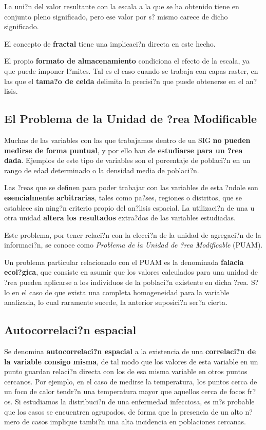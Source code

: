 La uni?n del valor resultante con la escala a la que se ha obtenido tiene en conjunto pleno significado, pero ese valor por s? mismo carece de dicho significado. 

El concepto de \textbf{fractal} tiene una implicaci?n directa en este hecho.

El propio \textbf{formato de almacenamiento} condiciona el efecto de la escala, ya que puede imponer l?mites. Tal es el caso cuando se trabaja con capas raster, en las que el \textbf{tama?o de celda} delimita la precisi?n que puede obtenerse en el an?lisis.

\subsection{El Problema de la Unidad de ?rea Modificable}

Muchas de las variables con las que trabajamos dentro de un SIG \textbf{no pueden medirse de forma puntual}, y por ello han de \textbf{estudiarse para un ?rea dada}. Ejemplos de este tipo de variables son el porcentaje de poblaci?n en un rango de edad determinado o la densidad media de poblaci?n.

Las ?reas que se definen para poder trabajar con las variables de esta ?ndole son \textbf{esencialmente arbitrarias}, tales como pa?ses, regiones o distritos, que se establece sin ning?n criterio propio del an?lisis espacial. La utilizaci?n de una u otra unidad \textbf{altera los resultados} extra?dos de las variables estudiadas.

Este problema, por tener relaci?n con la elecci?n de la unidad de agregaci?n de la informaci?n, se conoce como \emph{Problema de la Unidad de ?rea Modificable} (PUAM).


Un problema particular relacionado con el PUAM es la denominada \textbf{falacia ecol?gica}, que consiste en asumir que los valores calculados para una unidad de ?rea pueden aplicarse a los individuos de la poblaci?n existente en dicha ?rea. S?lo en el caso de que exista una completa homogeneidad para la variable analizada, lo cual raramente sucede, la anterior suposici?n ser?a cierta.

\subsection{Autocorrelaci?n espacial} 

Se denomina \textbf{autocorrelaci?n espacial} a la existencia de una \textbf{correlaci?n de la variable consigo misma}, de tal modo que los valores de esta variable en un punto guardan relaci?n directa con los de esa misma variable en otros puntos cercanos. Por ejemplo, en el caso de medirse la temperatura, los puntos cerca de un foco de calor tendr?n una temperatura mayor que aquellos cerca de focos fr?os. Si estudiamos la distribuci?n de una enfermedad infecciosa, es m?s probable que los casos se encuentren agrupados, de forma que la presencia de un alto n?mero de casos implique tambi?n una alta incidencia en poblaciones cercanas.

